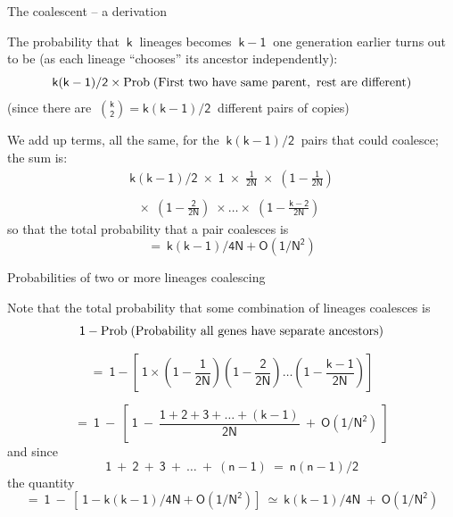 \documentclass[bluish,slideColor,colorBG,pdf]{prosper}
\def\Prob{{\rm Prob\;}}
\begin{document}
\begin{slide}[Replace]{The coalescent -- a derivation}
\bigskip

The probability that $~\mathsf{k}~$ lineages becomes $~\mathsf{k-1}~$ one generation
earlier turns out to be (as each lineage ``chooses'' its ancestor independently):
\[
\mathsf{k(k-1)/2 \times \Prob({\rm First~two~have~same~parent,~rest~are~different})}
\]
(since there are $~\mathsf{{k \choose 2} = k(k-1)/2}~$ different pairs of copies)

We add up terms, all the same, for the $~\mathsf{k(k-1)/2}~$ pairs that
could coalesce; the sum is:
\[
\begin{array}{r}
\mathsf{k(k-1)/2\;\times\;1\;\times\;\frac{1}{2N}\;\times\;\left(1 - \frac{1}{2N}\right)}
\\\\
\mathsf{\ \ \ \times\;\left(1 - \frac{2}{2N}\right)\;\times\dots
\times\;\left(1 - \frac{k-2}{2N}\right)}
\end{array}
\]
so that the total probability that a pair coalesces is
\[
\mathsf{=\  k(k-1)/4N + O(1/N^2)}
\]

\end{slide}

\begin{slide}[Replace]{Probabilities of two or more lineages coalescing}

Note that the total probability that some combination of lineages
coalesces is
\[
\mathsf{1 - \Prob({\rm Probability~all~genes~have~separate~ancestors})}
\]

\[
\mathsf{=\ 1 - \left[\ 1 \times \left(1 - \frac{1}{2N}\right) \left(1 - \frac{2}{2N}\right) \dots \left(1 - \frac{k-1}{2N}\right)\right]}
\]

\[
\mathsf{=\ 1\ -\ \left[\ 1\ -\ \frac{1+2+3+\dots+(k-1)}{2N}\ +\ O(1/N^2)\ \right]}
\]
and since
\[
\mathsf{1\ +\ 2\ +\ 3\ +\ \dots\ +\ (n-1) \ = \ n(n-1)/2}
\]
the quantity
\[
\mathsf{= \ 1\ -\ \left[\ 1 - k(k-1)/4N + O(1/N^2)\right] \ \simeq \ k(k-1)/4N\ + \ O(1/N^2)}
\]

\end{slide}
\end{document}
